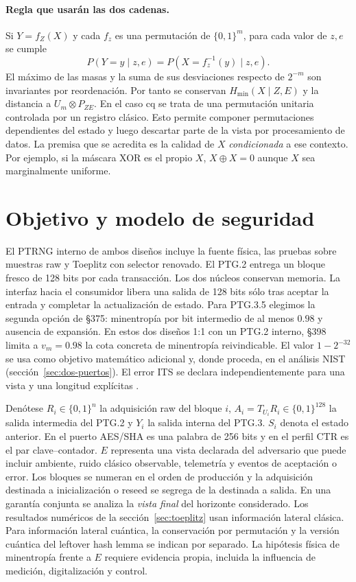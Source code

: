 \documentclass[11pt,a4paper]{article}
\newcommand{\bits}{\{0,1\}}
\newcommand{\hm}{H_{\min}}
\begin{document}
\paragraph{Regla que usarán las dos cadenas.}
Si \(Y=f_Z(X)\) y cada \(f_z\) es una permutación de
\(\bits^m\), para cada valor de \(z,e\) se cumple
\[
 P(Y=y\mid z,e)=P(X=f_z^{-1}(y)\mid z,e).
\]
El máximo de las masas y la suma de sus desviaciones
respecto de \(2^{-m}\) son invariantes por reordenación.
Por tanto se conservan
\(\hm(X\mid Z,E)\) y la distancia a
\(U_m\otimes P_{ZE}\). En el caso cq se trata de una
permutación unitaria controlada por un registro clásico.
Esto permite componer permutaciones dependientes del
estado y luego descartar parte de la vista por
procesamiento de datos. La premisa que se acredita es
la calidad de \(X\) \emph{condicionada} a ese contexto.
Por ejemplo, si la máscara XOR es el propio \(X\),
\(X\oplus X=0\) aunque \(X\) sea marginalmente uniforme.


\section{Objetivo y modelo de seguridad}

El PTRNG interno de ambos diseños incluye la fuente física, las pruebas sobre
muestras raw y Toeplitz con selector renovado. El PTG.2 entrega un bloque fresco
de 128 bits por cada transacción. Los dos núcleos conservan memoria. La interfaz
hacia el consumidor libera una salida de 128 bits sólo tras aceptar la entrada y
completar la actualización de estado. Para PTG.3.5 elegimos la segunda opción de §375: minentropía
por bit intermedio de al menos $0.98$ y ausencia de expansión. En estos
dos diseños 1:1 con un PTG.2 interno, §398 limita a $v_m=0.98$ la cota
concreta de minentropía reivindicable. El valor $1-2^{-32}$ se usa como
objetivo matemático adicional y, donde proceda, en el análisis NIST
(sección~\ref{sec:dos-puertos}). El error ITS se declara independientemente para
una vista y una longitud explícitas \cite[§§315--319,375,382,395--403]{ais}.

Denótese $R_i\in\bits^n$ la adquisición raw del bloque $i$,
$A_i=T_{U_i} R_i\in\bits^{128}$ la salida intermedia del PTG.2 y $Y_i$ la salida
interna del PTG.3. $S_i$ denota el estado anterior. En el puerto AES/SHA es una palabra de
256 bits y en el perfil CTR es el par clave--contador.
$E$ representa una vista declarada del adversario que puede incluir ambiente,
ruido clásico observable, telemetría y eventos de aceptación o error.
Los bloques se numeran en el orden de producción y la adquisición destinada
a inicialización o reseed se segrega de la destinada a salida. En una garantía
conjunta se analiza la \emph{vista final} del horizonte considerado.
Los resultados numéricos de la sección~\ref{sec:toeplitz} usan información
lateral clásica. Para información lateral cuántica, la conservación por
permutación y la versión cuántica del leftover hash lemma se indican por
separado. La hipótesis física de minentropía frente a $E$ requiere evidencia
propia, incluida la influencia de medición, digitalización y control.
\end{document}
